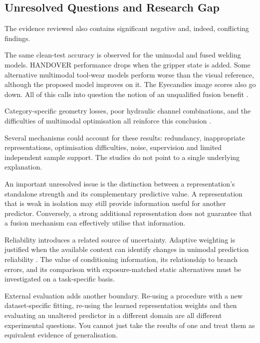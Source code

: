 \subsection{Unresolved Questions and Research Gap}

The evidence reviewed also contains significant negative and, indeed, conflicting findings.

The same clean-test accuracy is observed for the unimodal and fused welding models. HANDOVER
performance drops when the gripper state is added. Some alternative multimodal tool-wear models
perform worse than the visual reference, although the proposed model improves on it. The Eyecandies
image scores also go down. All of this calls into question the notion of an unqualified fusion
benefit \parencite{hua_anti-interference_2026,thoduka_multimodal_2024,zhang_tool_2026,xu_cross-modal_2026}.

Category-specific geometry losses, poor hydraulic channel combinations, and the difficulties of
multimodal optimisation all reinforce this conclusion
\parencite{horwitz_back_2023,bonfiglioli_eyecandies_2023,goodarzi_deep_2023,wang_what_2020}.

Several mechanisms could account for these results: redundancy, inappropriate representations,
optimisation difficulties, noise, supervision and limited independent sample support. The studies do
not point to a single underlying explanation.

An important unresolved issue is the distinction between a representation's standalone strength and
its complementary predictive value. A representation that is weak in isolation may still provide
information useful for another predictor. Conversely, a strong additional representation does not
guarantee that a fusion mechanism can effectively utilise that information.

Reliability introduces a related source of uncertainty. Adaptive weighting is justified when the
available context can identify changes in unimodal prediction reliability \parencite{zhang_provable_2023,wei_unbiased_2026}.
The value of conditioning information, its relationship to branch errors, and its comparison with
exposure-matched static alternatives must be investigated on a task-specific basis.

External evaluation adds another boundary. Re-using a procedure with a new dataset-specific fitting,
re-using the learned representation weights and then evaluating an unaltered predictor in a
different domain are all different experimental questions. You cannot just take the results of one
and treat them as equivalent evidence of generalisation.


